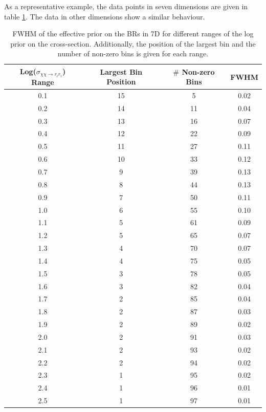 \documentclass{article}
\begin{document}
As a representative example, the data points in seven dimensions are given in table \ref{FWHM_7D}. The data in other dimensions show a similar behaviour.
\begin{table}[htp]
\centering
\fontsize{9}{9}\selectfont
\begin{tabular}{c|c|c|c|}
\hline
\hline
 Log($\sigma_{\chi \chi \rightarrow r_i r_i}$) Range & Largest Bin Position & $\#$ Non-zero Bins & FWHM \\
\hline
0.1 & 15 & 5 & 0.02\\
0.2 & 14 & 11 & 0.04\\
0.3 & 13 & 16 & 0.07\\
0.4 & 12 & 22 & 0.09\\
0.5 & 11 & 27 & 0.11\\
0.6 & 10 & 33 & 0.12\\
0.7 & 9 & 39 & 0.13\\
0.8 & 8 & 44 & 0.13\\
0.9 & 7 & 50 & 0.11\\
1.0 & 6 & 55 & 0.10\\
1.1 & 5 & 61 & 0.09\\
1.2 & 5 & 65 & 0.07\\
1.3 & 4 & 70 & 0.07\\
1.4 & 4 & 75 & 0.05\\
1.5 & 3 & 78 & 0.05\\
1.6 & 3 & 82 & 0.04\\
1.7 & 2 & 85 & 0.04\\
1.8 & 2 & 87 & 0.03\\
1.9 & 2 & 89 & 0.02\\
2.0 & 2 & 91 & 0.03\\
2.1 & 2 & 93 & 0.02\\
2.2 & 2 & 94 & 0.02\\
2.3 & 1 & 95 & 0.02\\
2.4 & 1 & 96 & 0.01\\
2.5 & 1 & 97 & 0.01\\
\hline
\end{tabular}
\caption{\fontsize{9}{9}\selectfont FWHM of the effective prior on the BRs in 7D for different ranges of the log prior on the cross-section. Additionally, the position of the largest bin and the number of non-zero bins is given for each range.}
\label{FWHM_7D}
\end{table}
\end{document}
